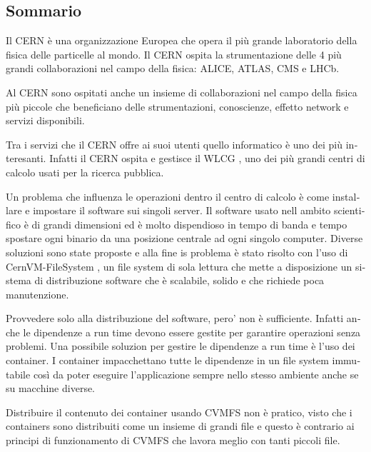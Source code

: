 \begin{otherlanguage}{italian}
\chapter*{Sommario}

Il CERN è una organizzazione Europea che opera il più grande laboratorio
        della fisica delle particelle al mondo.
Il CERN ospita la strumentazione delle 4 più grandi collaborazioni nel campo
        della fisica: ALICE, ATLAS, CMS e LHCb.

Al CERN sono ospitati anche un insieme di collaborazioni nel campo della fisica
        più piccole che beneficiano delle strumentazioni, conoscienze, effetto
        network e servizi disponibili.

Tra i servizi che il CERN offre ai suoi utenti quello informatico è uno dei
        più interesanti. Infatti il CERN ospita e gestisce il WLCG
        \cite{grid:website}, uno dei più grandi centri di calcolo usati per la
        ricerca pubblica.

Un problema che influenza le operazioni dentro il centro di calcolo è
        come installare e impostare il software sui singoli server. Il
        software usato nell ambito scientifico è di grandi dimensioni ed è molto
        dispendioso in tempo di banda e tempo spostare ogni binario da una
        posizione centrale ad ogni singolo computer. Diverse soluzioni sono
        state proposte e alla fine is problema è stato risolto con l'uso di
        CernVM-FileSystem \cite{cvmfs}, un file system di sola lettura che mette a
        disposizione un sistema di distribuzione software che è scalabile,
        solido e che richiede poca manutenzione.

Provvedere solo alla distribuzione del software, pero' non è sufficiente.
        Infatti anche le dipendenze a run time devono essere gestite per
        garantire operazioni senza problemi. Una possibile soluzion per gestire le
        dipendenze a run time è l'uso dei container. I container
        impacchettano tutte le dipendenze in un file system immutabile così da
        poter eseguire l'applicazione sempre nello stesso ambiente anche se su
        macchine diverse.

Distribuire il contenuto dei container usando CVMFS non è pratico, visto che
        i containers sono distribuiti come un insieme di grandi file e questo
        è contrario ai principi di funzionamento di CVMFS che lavora meglio
        con tanti piccoli file.


\end{otherlanguage}
